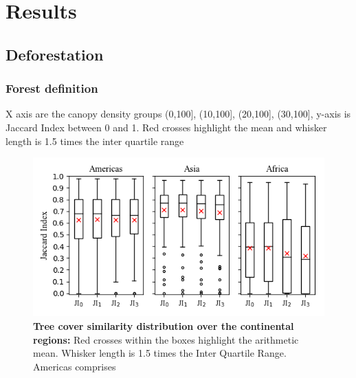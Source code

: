 \chapter{Results}
\label{ch:result}

	\section{Deforestation}
	\label{sec:deforestation}

		\subsection{Forest definition}
		\label{subsec:forest_definition}
			X axis are the canopy density groups (0,100], (10,100], (20,100], (30,100], y-axis is Jaccard Index between 0 and 1.  Red crosses highlight the mean and whisker length is 1.5 times the inter quartile range
			\begin{figure}[ht]
				\centering
				\includegraphics[scale=1]{img/jaccard}
				\caption[Tree cover similarity distribution of the continental regions]{\textbf{Tree cover similarity distribution over the continental regions:} Red crosses within the boxes highlight the arithmetic mean. Whisker length is 1.5 times the Inter Quartile Range. Americas comprises }
				\label{fig:jaccard}
			\end{figure}
